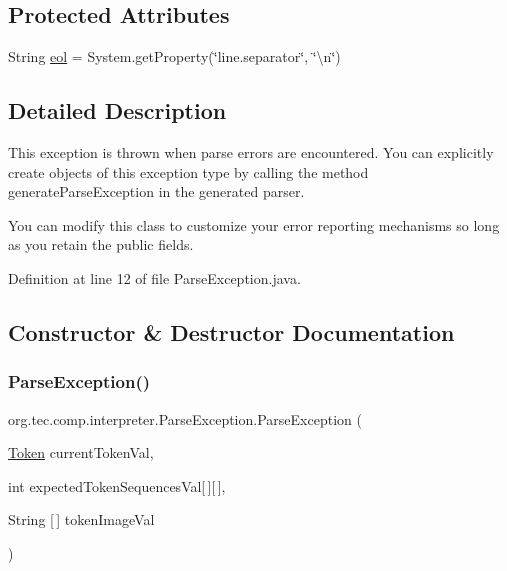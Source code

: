 \subsection*{Protected Attributes}
\begin{DoxyCompactItemize}
\item 
String \mbox{\hyperlink{classorg_1_1tec_1_1comp_1_1interpreter_1_1_parse_exception_a18e94211451c840a115611e78ebff392}{eol}} = System.\+get\+Property(\char`\"{}line.\+separator\char`\"{}, \char`\"{}\textbackslash{}n\char`\"{})
\end{DoxyCompactItemize}


\subsection{Detailed Description}
This exception is thrown when parse errors are encountered. You can explicitly create objects of this exception type by calling the method generate\+Parse\+Exception in the generated parser.

You can modify this class to customize your error reporting mechanisms so long as you retain the public fields. 

Definition at line 12 of file Parse\+Exception.\+java.



\subsection{Constructor \& Destructor Documentation}
\mbox{\label{classorg_1_1tec_1_1comp_1_1interpreter_1_1_parse_exception_a1866dd3d0d8c136c15f29c1d8f7577bc}} 
\subsubsection{\texorpdfstring{Parse\+Exception()}{ParseException()}\hspace{0.1cm}{\footnotesize\ttfamily [1/3]}}
{\footnotesize\ttfamily org.\+tec.\+comp.\+interpreter.\+Parse\+Exception.\+Parse\+Exception (\begin{DoxyParamCaption}\item[{\mbox{\hyperlink{classorg_1_1tec_1_1comp_1_1interpreter_1_1_token}{Token}}}]{current\+Token\+Val,  }\item[{int}]{expected\+Token\+Sequences\+Val\mbox{[}$\,$\mbox{]}\mbox{[}$\,$\mbox{]},  }\item[{String \mbox{[}$\,$\mbox{]}}]{token\+Image\+Val }\end{DoxyParamCaption})\hspace{0.3cm}{\ttfamily [inline]}}

